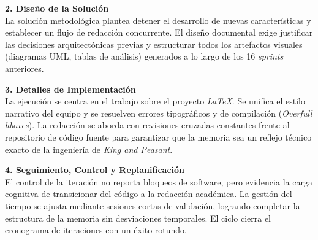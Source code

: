 \textbf{2. Diseño de la Solución} \\
La solución metodológica plantea detener el desarrollo de nuevas características y establecer un flujo de redacción concurrente. El diseño documental exige justificar las decisiones arquitectónicas previas y estructurar todos los artefactos visuales (diagramas UML, tablas de análisis) generados a lo largo de los 16 \textit{sprints} anteriores.

\textbf{3. Detalles de Implementación} \\
La ejecución se centra en el trabajo sobre el proyecto \textit{LaTeX}. Se unifica el estilo narrativo del equipo y se resuelven errores tipográficos y de compilación (\textit{Overfull hboxes}). La redacción se aborda con revisiones cruzadas constantes frente al repositorio de código fuente para garantizar que la memoria sea un reflejo técnico exacto de la ingeniería de \textit{King and Peasant}.

\textbf{4. Seguimiento, Control y Replanificación} \\
El control de la iteración no reporta bloqueos de software, pero evidencia la carga cognitiva de transicionar del código a la redacción académica. La gestión del tiempo se ajusta mediante sesiones cortas de validación, logrando completar la estructura de la memoria sin desviaciones temporales. El ciclo cierra el cronograma de iteraciones con un éxito rotundo.

